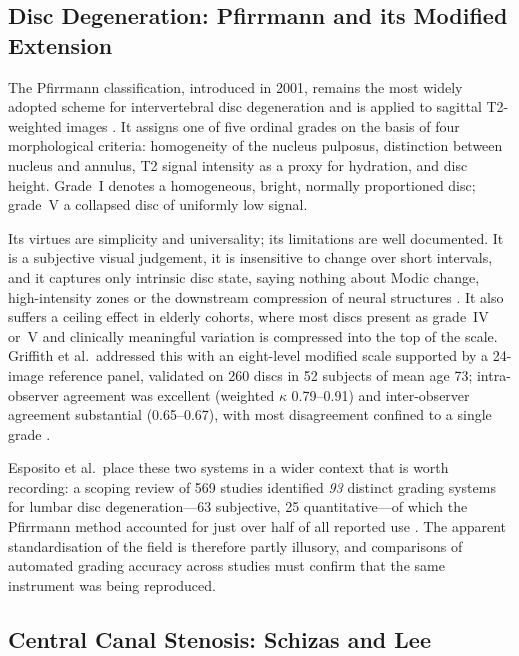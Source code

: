 \subsection{Disc Degeneration: Pfirrmann and its Modified Extension}
\label{sec:lr-pfirrmann}

The Pfirrmann classification, introduced in 2001, remains the most widely
adopted scheme for intervertebral disc degeneration and is applied to sagittal
T2-weighted images \cite{pfirrmann2001magnetic}. It assigns one of five ordinal
grades on the basis of four morphological criteria: homogeneity of the nucleus
pulposus, distinction between nucleus and annulus, T2 signal intensity as a
proxy for hydration, and disc height. Grade~I denotes a homogeneous, bright,
normally proportioned disc; grade~V a collapsed disc of uniformly low signal.

Its virtues are simplicity and universality; its limitations are well
documented. It is a subjective visual judgement, it is insensitive to change
over short intervals, and it captures only intrinsic disc state, saying nothing
about Modic change, high-intensity zones or the downstream compression of neural
structures \cite{esposito2025mribased,zhao2025advances}. It also suffers a
ceiling effect in elderly cohorts, where most discs present as grade~IV or~V and
clinically meaningful variation is compressed into the top of the scale.
Griffith et al.\ addressed this with an eight-level modified scale supported by a
24-image reference panel, validated on 260 discs in 52 subjects of mean age 73;
intra-observer agreement was excellent (weighted $\kappa$ 0.79--0.91) and
inter-observer agreement substantial (0.65--0.67), with most disagreement
confined to a single grade \cite{griffith2007modified}.

Esposito et al.\ place these two systems in a wider context that is worth
recording: a scoping review of 569 studies identified \emph{93} distinct grading
systems for lumbar disc degeneration---63 subjective, 25 quantitative---of which
the Pfirrmann method accounted for just over half of all reported use
\cite{esposito2025mribased}. The apparent standardisation of the field is
therefore partly illusory, and comparisons of automated grading accuracy across
studies must confirm that the same instrument was being reproduced.

\subsection{Central Canal Stenosis: Schizas and Lee}
\label{sec:lr-central-grading}


